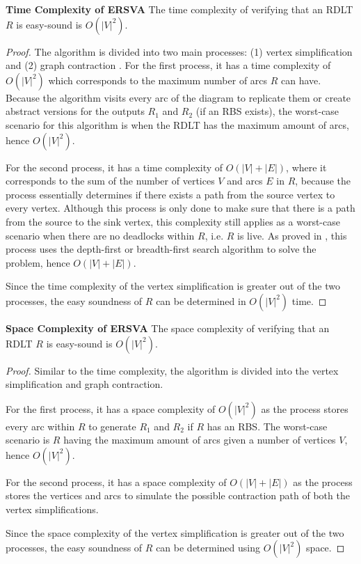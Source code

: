 \begin{thm}\textbf{Time Complexity of ERSVA}
    The time complexity of verifying that an RDLT $ R $ is easy-sound is $ O(|V|^2) $.
    \label{TCERSVA}
\end{thm}
\begin{proof}
    The algorithm is divided into two main processes: (1) vertex simplification \cite{Malinao2017} and (2) graph contraction \cite{Malinao2017, MalinaoPJS2023}. For the first process, it has a time complexity of $ O(|V|^2)$ which corresponds to the maximum number of arcs $ R $ can have. Because the algorithm visits every arc of the diagram to replicate them or create abstract versions for the outputs $ R_1 $ and $ R_2 $ (if an RBS exists), the worst-case scenario for this algorithm is when the RDLT has the maximum amount of arcs, hence $ O(|V|^2) $. 
    
    For the second process, it has a time complexity of $ O(|V|+|E|)$, where it corresponds to the sum of the number of vertices $ V $ and arcs $ E $ in $ R $, because the process essentially determines if there exists a path from the source vertex to every vertex. Although this process is only done to make sure that there is a path from the source to the sink vertex, this complexity still applies as a worst-case scenario when there are no deadlocks within $ R $, i.e. $ R $ is live. As proved in \cite{MalinaoPJS2023}, this process uses the depth-first or breadth-first search algorithm to solve the problem, hence $ O(|V|+|E|) $.

    Since the time complexity of the vertex simplification is greater out of the two processes, the easy soundness of $ R $ can be determined in $ O(|V|^2) $ time.
\end{proof}

\begin{thm}\textbf{Space Complexity of ERSVA}
    \label{SCERSVA}
    The space complexity of verifying that an RDLT $ R $ is easy-sound is $ O(|V|^2) $.
\end{thm}
\begin{proof}
    Similar to the time complexity, the algorithm is divided into the vertex simplification and graph contraction. 
    
    For the first process, it has a space complexity of $ O(|V|^2)$ as the process stores every arc within $ R $ to generate $ R_1 $ and $ R_2 $ if $ R $ has an RBS. The worst-case scenario is $ R $ having the maximum amount of arcs given a number of vertices $ V $,  hence $ O(|V|^2) $. 

    For the second process, it has a space complexity of $ O(|V| + |E|) $ \cite{MalinaoPJS2023} as the process stores the vertices and arcs to simulate the possible contraction path of both the vertex simplifications. 

    Since the space complexity of the vertex simplification is greater out of the two processes, the easy soundness of $ R $ can be determined using $ O(|V|^2) $ space.
\end{proof}
